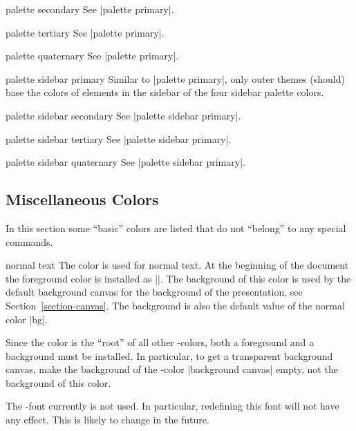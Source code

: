 \begin{element}{palette secondary}\no\yes\no
  See |palette primary|.
\end{element}

\begin{element}{palette tertiary}\no\yes\no
  See |palette primary|.
\end{element}

\begin{element}{palette quaternary}\no\yes\no
  See |palette primary|.
\end{element}

\begin{element}{palette sidebar primary}\no\yes\no
  Similar to |palette primary|, only outer themes (should) base the
  colors of elements in the sidebar of the four sidebar palette
  colors.
\end{element}

\begin{element}{palette sidebar secondary}\no\yes\no
  See |palette sidebar primary|.
\end{element}

\begin{element}{palette sidebar tertiary}\no\yes\no
  See |palette sidebar primary|.
\end{element}

\begin{element}{palette sidebar quaternary}\no\yes\no
  See |palette sidebar primary|.
\end{element}



\subsection{Miscellaneous  Colors}

In this section some ``basic'' colors are listed that do not
``belong'' to any special commands. 

\begin{element}{normal text}\no\yes\yes
  The color is used for normal text. At the beginning of
  the document the foreground color is installed as
  |\normalcolor|. The background of this color is used by the
  default background canvas for the background of the
  presentation, see Section~\ref{section-canvas}. The background is
  also the default value of the normal color |bg|. 

  Since the color is the ``root'' of all other \beamer-colors, both a
  foreground and a background must be installed. In particular, to get
  a transparent background canvas, make the background of the
  \beamer-color |background canvas| empty, not the background of this
  color.

  The \beamer-font currently is not used. In particular, redefining this
  font will not have any effect. This is likely to change in the future.
\end{element}

